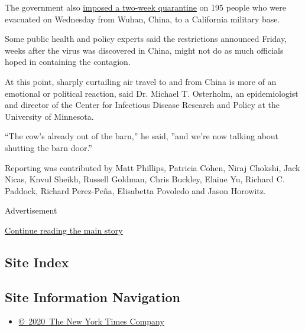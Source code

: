 The government also
\href{https://www.nytimes.com/2020/01/31/health/quarantine-coronavirus.html}{imposed
a two-week quarantine} on 195 people who were evacuated on Wednesday
from Wuhan, China, to a California military base.

Some public health and policy experts said the restrictions announced
Friday, weeks after the virus was discovered in China, might not do as
much officials hoped in containing the contagion.

At this point, sharply curtailing air travel to and from China is more
of an emotional or political reaction, said Dr. Michael T. Osterholm, an
epidemiologist and director of the Center for Infectious Disease
Research and Policy at the University of Minnesota.

``The cow's already out of the barn,'' he said, ''and we're now talking
about shutting the barn door.''

Reporting was contributed by Matt Phillips, Patricia Cohen, Niraj
Chokshi, Jack Nicas, Knvul Sheikh, Russell Goldman, Chris Buckley,
Elaine Yu, Richard C. Paddock, Richard Perez-Peña, Elisabetta Povoledo
and Jason Horowitz.

Advertisement

\protect\hyperlink{after-bottom}{Continue reading the main story}

\hypertarget{site-index}{%
\subsection{Site Index}\label{site-index}}

\hypertarget{site-information-navigation}{%
\subsection{Site Information
Navigation}\label{site-information-navigation}}

\begin{itemize}
\tightlist
\item
  \href{https://help.nytimes.com/hc/en-us/articles/115014792127-Copyright-notice}{©~2020~The
  New York Times Company}
\end{itemize}

